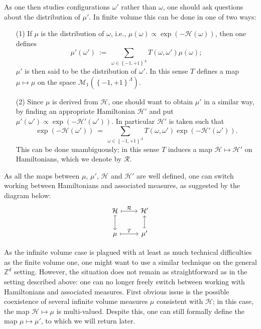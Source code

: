 \documentclass[12pt]{article}
\renewcommand{\H}{\mathcal{H}}
\newcommand{\M}{\mathcal{M}}
\newcommand{\RR}{\mathcal{R}}
\newcommand{\Z}{\mathbb{Z}}
\newcommand{\set}[1]{\left\{#1\right\}}
\newcommand{\1}{\mathbbm{1}}
\newcommand{\5}{\vspace{0.5cm}}
\theoremstyle{definition}
\begin{document}
As one then studies configurations $\omega'$ rather than $\omega$, one should ask questions about the distribution of $\mu'$. In finite volume this can be done in one of two ways:
\begin{itemize}
	\item[(1)] If $\mu$ is the distribution of $\omega$, i.e., $\mu(\omega)\propto\exp(-\H(\omega))$, then one defines
	$$\mu'(\omega') ~:=~ \sum_{\omega\in\set{-1,+1}^\Lambda}T(\omega,\omega')\mu(\omega);$$
	$\mu'$ is then said to be the distribution of $\omega'$. In this sense $T$ defines a map $\mu\mapsto\mu$ on the space $\M_1(\set{-1,+1}^\Lambda)$.
	\item[(2)] Since $\mu$ is derived from $\H$, one should want to obtain $\mu'$ in a similar way, by finding an appropriate Hamiltonian $\H'$ and put $\mu'(\omega')\propto\exp(-\H'(\omega'))$. In particular $\H'$ is taken such that
	$$\exp(-\H(\omega')) ~=~ \sum_{\omega\in\set{-1,+1}^{\Lambda}}T(\omega,\omega')\exp(-\H'(\omega')).$$
	This can be done unambiguously; in this sense $T$ induces a map $\H\mapsto\H'$ on Hamiltonians, which we denote by $\RR$.
\end{itemize}

As all the maps between $\mu$, $\mu'$, $\H$ and $\H'$ are well defined, one can switch working between Hamiltonians and associated measures, as suggested by the diagram below:
\begin{equation}\label{RGdiagram}
\begin{tikzcd}
    \H \arrow[r, mapsto, "\RR"] \arrow[d, mapsto] & \H' \\
    \mu \arrow[r, mapsto, "T"] & \mu' \arrow[u, mapsto]
\end{tikzcd}
\end{equation}

As the infinite volume case is plagued with at least as much technical difficulties as the finite volume one, one might want to use a similar technique on the general $\Z^d$ setting. However, the situation does not remain as straightforward as in the setting described above: one can no longer freely switch between working with Hamiltonians and associated measures. First obvious issue is the possible coexistence of several infinite volume measures $\mu$ consistent with $\H$; in this case, the map $\H\mapsto\mu$ is multi-valued. Despite this, one can still formally define the map $\mu\mapsto\mu'$, to which we will return later. \\
\end{document}
